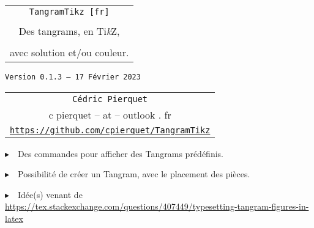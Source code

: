 \documentclass{article}
\def\TPversion{0.1.3}
\def\TPdate{17 Février 2023}
\begin{document}
\pagestyle{fancy}

\thispagestyle{empty}

\vspace{2cm}

\begin{center}
	\begin{minipage}{0.75\linewidth}
	\begin{tcolorbox}[colframe=yellow,colback=yellow!15]
		\begin{center}
			\begin{tabular}{c}
				{\Huge \texttt{TangramTikz [fr]}}\\
				\\
				{\LARGE Des tangrams, en Ti\textit{k}Z}, \\
				\\
				{\LARGE avec solution et/ou couleur.} \\
			\end{tabular}
			
			\medskip
			
			{\small \texttt{Version \TPversion{} -- \TPdate}}
		\end{center}
	\end{tcolorbox}
\end{minipage}
\end{center}

\vspace{0.5cm}

\begin{center}
	\begin{tabular}{c}
	\texttt{Cédric Pierquet}\\
	{\ttfamily c pierquet -- at -- outlook . fr}\\
	\texttt{\url{https://github.com/cpierquet/TangramTikz}}
\end{tabular}
\end{center}

\vspace{0.5cm}

{$\blacktriangleright$~~Des commandes pour afficher des Tangrams prédéfinis.}

\smallskip

{$\blacktriangleright$~~Possibilité de créer un Tangram, avec le placement des pièces.}

\smallskip

{$\blacktriangleright$~~Idée(s) venant de \url{https://tex.stackexchange.com/questions/407449/typesetting-tangram-figures-in-latex}}

\vspace{1cm}
\end{document}
